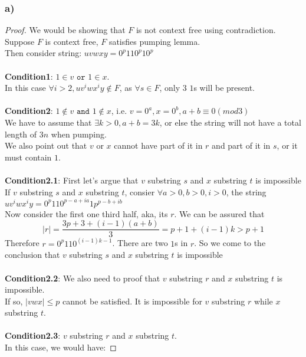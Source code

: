 \documentclass{article}
\begin{document}
\subsubsection{a)}
	\begin{proof}
		We would be showing that $F$ is not context free using contradiction. \\
		Suppose $F$ is context free, $F$ satisfies pumping lemma. \\
		Then consider string: $uvwxy = 0^{p}110^{p}10^{p}$ \\
		\\
		\textbf{Condition1}: 
			$1 \in v \texttt{ or } 1 \in x$. \\
			In this case $\forall i > 2, uv^iwx^iy \notin F$, as $\forall s \in F$, only 3 $1$s will be present. \\
		\\
		\textbf{Condition2}: 
			$1 \notin v \texttt{ and } 1 \notin x$, i.e. $v = 0^a, x = 0^b, a+b \equiv 0 (mod 3)$ \\
			We have to assume that $\exists k > 0, a+b = 3k$, or else the string will not have a total length of $3n$ when pumping. \\	
			We also point out that $v$ or $x$ cannot have part of it in $r$ and part of it in $s$, or it must contain $1$. \\
			\\
			\textbf{Condition2.1}: First let's argue that $v$ substring $s$ and $x$ substring $t$ is impossible\\
				If $v$ substring $s$ and $x$ substring $t$, consier $\forall a > 0, b>0, i>0$, the string $uv^iwx^iy = 0^p110^{p-a+ia}1p^{p-b+ib}$ \\
				Now consider the first one third half, aka, its $r$. We can be assured that $$|r| = \frac{3p + 3 + (i-1)(a+b)}{3} = p+1+(i-1)k > p+1$$
				Therefore $r = 0^p110^{(i-1)k-1}$. There are two $1$s in $r$.
				So we come to the conclusion that $v$ substring $s$ and $x$ substring $t$ is impossible \\ 
			\\
			\textbf{Condition2.2}: We also need to proof that $v$ substring $r$ and $x$ substring $t$ is impossible. \\
			If so, $|vwx| \le p$ cannot be satisfied. It is impossible for $v$ substring $r$ while $x$ substring $t$.\\
			\\
			\textbf{Condition2.3}: 
				$v$ substring $r$ and $x$ substring $t$. \\
				In this case, we would have: 

\end{proof}
\end{document}
